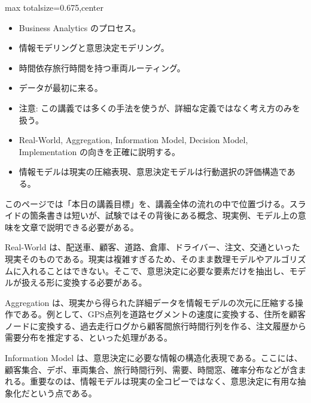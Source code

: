 \clearpage
{}
\begin{adjustbox}{max totalsize={\textwidth}{0.675\textheight},center}
\begin{minipage}{\textwidth}\scriptsize
\begin{minipage}[t]{0.485\textwidth}
\begin{itemize}
\item Business Analytics のプロセス。
\item 情報モデリングと意思決定モデリング。
\item 時間依存旅行時間を持つ車両ルーティング。
\item データが最初に来る。
\item 注意: この講義では多くの手法を使うが、詳細な定義ではなく考え方のみを扱う。
\end{itemize}
\begin{itemize}
\item Real-World, Aggregation, Information Model, Decision Model, Implementation の向きを正確に説明する。
\item 情報モデルは現実の圧縮表現、意思決定モデルは行動選択の評価構造である。
\end{itemize}
\end{minipage}\hfill
\begin{minipage}[t]{0.485\textwidth}
このページでは「本日の講義目標」を、講義全体の流れの中で位置づける。スライドの箇条書きは短いが、試験ではその背後にある概念、現実例、モデル上の意味を文章で説明できる必要がある。\par
Real-World は、配送車、顧客、道路、倉庫、ドライバー、注文、交通といった現実そのものである。現実は複雑すぎるため、そのまま数理モデルやアルゴリズムに入れることはできない。そこで、意思決定に必要な要素だけを抽出し、モデルが扱える形に変換する必要がある。\par
Aggregation は、現実から得られた詳細データを情報モデルの次元に圧縮する操作である。例として、GPS点列を道路セグメントの速度に変換する、住所を顧客ノードに変換する、過去走行ログから顧客間旅行時間行列を作る、注文履歴から需要分布を推定する、といった処理がある。\par
Information Model は、意思決定に必要な情報の構造化表現である。ここには、顧客集合、デポ、車両集合、旅行時間行列、需要、時間窓、確率分布などが含まれる。重要なのは、情報モデルは現実の全コピーではなく、意思決定に有用な抽象化だという点である。\par

\end{minipage}
\end{minipage}
\end{adjustbox}
